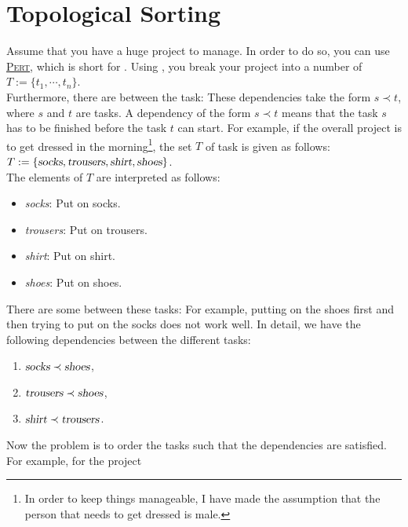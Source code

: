 \section{Topological Sorting}
Assume that you have a huge project to manage.  In order to do so, you can use 
\href{https://en.wikipedia.org/wiki/Program_evaluation_and_review_technique}{\textsc{Pert}}, which is short for
.  Using ,
you break your project into a number of 
\\[0.2cm]
\hspace*{1.3cm}
$T := \{t_1,\cdots,t_n\}$.  
\\[0.2cm]
Furthermore, there are  between the task: These dependencies take the form $s \prec t$, where $s$ and
$t$ are tasks.  A dependency of the form $s \prec t$ means that the task $s$ has to be finished before the task $t$
can start.  For example, if the overall project is to get dressed in the morning\footnote{
  In order to keep things manageable, I have made the assumption that the person that needs to get dressed is male.
}, the set $T$ of task is given
as follows:
\\[0.2cm]
\hspace*{1.3cm}
$T := \{ \textsl{socks}, \textsl{trousers}, \textsl{shirt}, \textsl{shoes} \}$.
\\[0.2cm]
The elements of $T$ are interpreted as follows:
\begin{itemize}
\item \textsl{socks}: Put on socks.
\item \textsl{trousers}: Put on trousers.
\item \textsl{shirt}: Put on shirt.
\item \textsl{shoes}: Put on shoes.
\end{itemize}
There are some  between these tasks:  For example, putting on the shoes first and then trying to
put on the socks does not work well.  In detail, we have the following dependencies between the different tasks:
\begin{enumerate}
\item $\textsl{socks} \prec \textsl{shoes}$,
\item $\textsl{trousers} \prec \textsl{shoes}$,
\item $\textsl{shirt} \prec \textsl{trousers}$.
\end{enumerate}
Now the problem is to order the tasks such that the dependencies are satisfied.  For example, for the project
